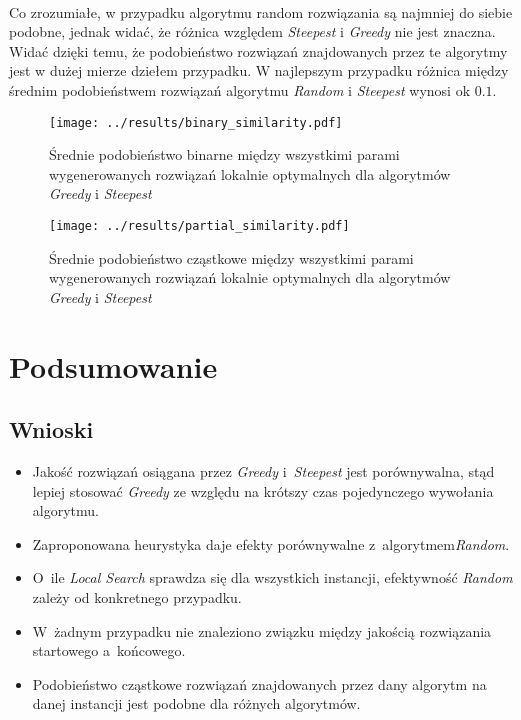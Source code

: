 \documentclass{article}
\begin{document}
	\\Co zrozumiałe, w przypadku algorytmu random rozwiązania są najmniej do siebie podobne, jednak widać, że różnica względem \emph{Steepest} i \emph{Greedy} nie jest znaczna. Widać dzięki temu, że podobieństwo rozwiązań znajdowanych przez te algorytmy jest w dużej mierze dziełem przypadku. W najlepszym przypadku różnica między średnim podobieństwem rozwiązań algorytmu \emph{Random} i \emph{Steepest} wynosi ok $0.1$.
			\begin{figure}[h]
				\texttt{[image: ../results/binary\_similarity.pdf]}
				\caption{Średnie podobieństwo binarne między wszystkimi parami wygenerowanych rozwiązań lokalnie optymalnych dla algorytmów \emph{Greedy} i \emph{Steepest}\label{fig:bin_sim}}		
			\end{figure}				
			\begin{figure}[h]
				\texttt{[image: ../results/partial\_similarity.pdf]}
				\caption{Średnie podobieństwo cząstkowe między wszystkimi parami wygenerowanych rozwiązań lokalnie optymalnych dla algorytmów \emph{Greedy} i \emph{Steepest}\label{fig:part_sim}}		
			\end{figure}	
		
\section{Podsumowanie}
	\subsection{Wnioski}
		\begin{itemize}
			\item Jakość rozwiązań osiągana przez \emph{Greedy} i~\emph{Steepest} jest porównywalna, stąd lepiej stosować \emph{Greedy} ze względu na krótszy czas pojedynczego wywołania algorytmu.
			\item Zaproponowana heurystyka daje efekty porównywalne z~algorytmem\emph{Random}.
			\item O~ile \emph{Local Search} sprawdza się dla wszystkich instancji, efektywność 	\emph{Random} zależy od konkretnego przypadku.
			\item W~żadnym przypadku nie znaleziono związku między jakością rozwiązania startowego a~końcowego.
			\item Podobieństwo cząstkowe rozwiązań znajdowanych przez dany algorytm na danej instancji jest podobne dla różnych algorytmów.
		\end{itemize}





\end{document}
